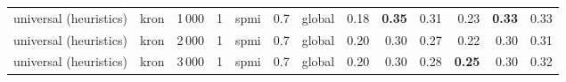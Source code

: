 \begin{tabular}{lllllllrrrrrr}
universal (heuristics) & kron & 1\,000 & 1    & spmi  & 0.7 & global &                 0.18  &          \textbf{0.35} &                   0.31  &                    0.23  &             \textbf{0.33} &                0.33  \\
universal (heuristics) & kron & 2\,000 & 1    & spmi  & 0.7 & global &                 0.20  &                  0.30  &                   0.27  &                    0.22  &                     0.30  &                0.31  \\
universal (heuristics) & kron & 3\,000 & 1    & spmi  & 0.7 & global &                 0.20  &                  0.30  &                   0.28  &            \textbf{0.25} &                     0.30  &                0.32  \\
\bottomrule
\end{tabular}
